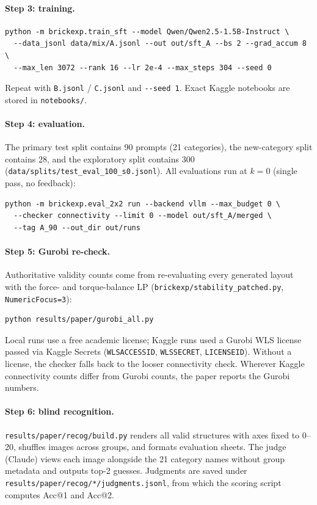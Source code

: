 \documentclass{article}
\begin{document}
\paragraph{Step 3: training.}
{\small
\begin{verbatim}
python -m brickexp.train_sft --model Qwen/Qwen2.5-1.5B-Instruct \
  --data_jsonl data/mix/A.jsonl --out out/sft_A --bs 2 --grad_accum 8 \
  --max_len 3072 --rank 16 --lr 2e-4 --max_steps 304 --seed 0
\end{verbatim}}
\noindent Repeat with \texttt{B.jsonl} / \texttt{C.jsonl} and \texttt{-{}-seed 1}. Exact Kaggle notebooks are stored in \texttt{notebooks/}.

\paragraph{Step 4: evaluation.} The primary test split contains 90 prompts (21 categories), the new-category split contains 28, and the exploratory split contains 300 (\texttt{data/splits/test\_eval\_100\_s0.jsonl}). All evaluations run at $k{=}0$ (single pass, no feedback):
{\small
\begin{verbatim}
python -m brickexp.eval_2x2 run --backend vllm --max_budget 0 \
  --checker connectivity --limit 0 --model out/sft_A/merged \
  --tag A_90 --out_dir out/runs
\end{verbatim}}

\paragraph{Step 5: Gurobi re-check.} Authoritative validity counts come from re-evaluating every generated layout with the force- and torque-balance LP (\texttt{brickexp/stability\_patched.py}, \texttt{NumericFocus=3}):
{\small
\begin{verbatim}
python results/paper/gurobi_all.py
\end{verbatim}}
\noindent Local runs use a free academic license; Kaggle runs used a Gurobi WLS license passed via Kaggle Secrets (\texttt{WLSACCESSID}, \texttt{WLSSECRET}, \texttt{LICENSEID}). Without a license, the checker falls back to the looser connectivity check. Wherever Kaggle connectivity counts differ from Gurobi counts, the paper reports the Gurobi numbers.

\paragraph{Step 6: blind recognition.} \texttt{results/paper/recog/build.py} renders all valid structures with axes fixed to 0--20, shuffles images across groups, and formats evaluation sheets. The judge (Claude) views each image alongside the 21 category names without group metadata and outputs top-2 guesses. Judgments are saved under \texttt{results/paper/recog/*/judgments.jsonl}, from which the scoring script computes Acc@1 and Acc@2.
\end{document}
